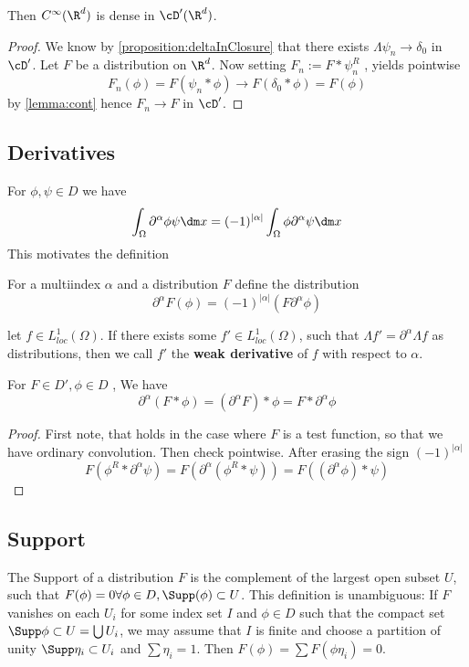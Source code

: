 	\begin{corollary}
		Then $C^\infty(\R^d)$ is dense in $\cD'(\R^d)$.
	\end{corollary}
	\begin{proof}
		We know by \ref{proposition:deltaInClosure} that there exists $\Lambda \psi_n \to \delta_0$ in $\cD'$.
		Let $F$ be a distribution on $\R^d$. Now setting $F_n := F * \psi_n^R$ , yields pointwise
		\[
		F_n(\phi) = F (\psi_n * \phi) \to F(\delta_0 * \phi) = F (\phi)
		\]
		by \ref{lemma:cont}
		hence $F_n \to F$ in $\cD'$.  %

	\end{proof}
	\subsection{Derivatives}
	For $\phi , \psi \in D$ we have
	\[
	\int_\Omega \partial^\alpha \phi \psi \dm x = (-1)^{|\alpha|} \int_\Omega \phi \partial^\alpha \psi \dm x
	\]
	This motivates the definition
	\begin{definition}
		For a multiindex $\alpha$ and a distribution $F$ define the distribution
		\[\partial^\alpha F (\phi) = (-1)^{|\alpha|}(F \partial^\alpha \phi)\]
	\end{definition}
	\begin{remark}
		let $f \in L^1_{loc}(\Omega)$. If there exists some $f' \in L^1_{loc}(\Omega)$, such that $\Lambda f' = \partial^\alpha \Lambda  f$ as distributions, then we call $f'$ the {\bf weak derivative} of $f$ with respect to $\alpha$.
	\end{remark}
	\begin{proposition}
		For $F \in D', \phi \in D $ , We have
		\[\partial^\alpha (F * \phi) = (\partial^\alpha F) * \phi = F * \partial^\alpha \phi\]
	\end{proposition}
	\begin{proof}
		First note, that holds in the case where $F$ is a test function, so that we have ordinary convolution.
		Then check pointwise. After erasing the sign $(-1)^{|\alpha|}$
		\[
		F(\phi^R * \partial^\alpha \psi) = F(\partial^\alpha (\phi^R * \psi)) = F((\partial^\alpha \phi) * \psi)
		\]

	\end{proof}
	\subsection{Support}
	The Support of a distribution $F$ is the complement of the largest open subset $U$, such that $F(\phi) = 0 \forall \phi \in D, \Supp(\phi) \subset U$.  This definition is unambiguous: If $F$ vanishes on each $U_i$ for some index set $I$ and $\phi \in D$ such that the compact set $\Supp \phi \subset U = \bigcup U_i$, we may assume that $I$ is finite and choose a partition of unity $\Supp \eta_i \subset U_i$ and $\sum \eta_i = 1$. Then $F(\phi) = \sum F(\phi \eta_i) = 0$.
